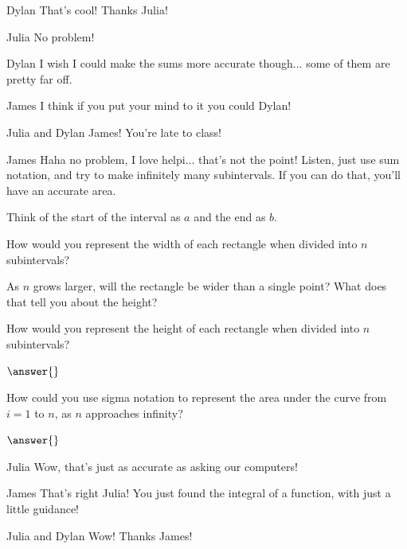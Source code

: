 \documentclass{ximera}
\begin{document}
\begin{dialogue}
\item[Dylan] That's cool! Thanks Julia!
\item[Julia] No problem!
\item[Dylan] I wish I could make the sums more accurate though... some of them are pretty far off.
\item[James] I think if you put your mind to it you could Dylan!
\item[Julia and Dylan] James! You're late to class!
\item[James] Haha no problem, I love helpi... that's not the point! Listen, just use sum notation, and try to make infinitely many subintervals. If you can do that, you'll have an accurate area.
\end{dialogue}
\begin{question}

\begin{hint}
Think of the start of the interval as $a$ and the end as $b$.
\end{hint}

How would you represent the width of each rectangle when divided into $n$ subintervals?

\begin{multipleChoice}
\choice{}
\choice{}
\choice{}
\choice{}
\end{multipleChoice}

\begin{hint}
As $n$ grows larger, will the rectangle be wider than a single point? What does that tell you about the height?
\end{hint}

How would you represent the height of each rectangle when divided into $n$ subintervals?

$\answer{}$

How could you use sigma notation to represent the area under the curve from $i = 1$ to $n$, as $n$ approaches infinity?

$\answer{}$

\end{question}
\begin{dialogue}
\item[Julia] Wow, that's just as accurate as asking our computers!
\item[James] That's right Julia! You just found the integral of a function, with just a little guidance!
\item[Julia and Dylan] Wow! Thanks James!
\end{dialogue}
\end{document}
